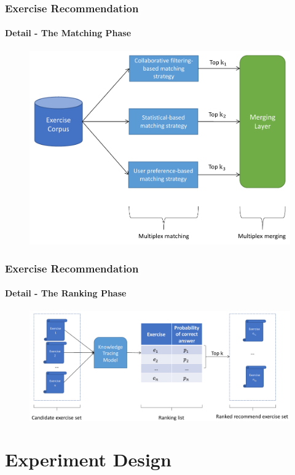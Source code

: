 \documentclass{beamer}
\begin{document}
\begin{frame}
	\frametitle{Exercise Recommendation}
	\framesubtitle{Detail - The Matching Phase}
	\begin{figure}
		\centering
		\includegraphics[height=0.7\textheight]{figures/ch4-matching-model.pdf}
	\end{figure}
\end{frame}

\begin{frame}
	\frametitle{Exercise Recommendation}
	\framesubtitle{Detail - The Ranking Phase}
	\begin{figure}
		\centering
		\includegraphics[width=1.0\textwidth]{figures/ch4-ranking-model.pdf}
	\end{figure}
\end{frame}

\section{Experiment Design}
\end{document}
